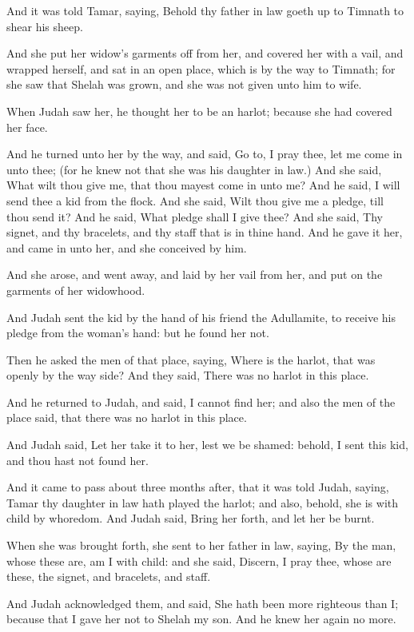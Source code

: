 \Verse And it was told Tamar, saying, Behold thy father in law goeth up to Timnath to shear his sheep.

\Verse And she put her widow's garments off from her, and covered her with a vail, and wrapped herself, and sat in an open place, which is by the way to Timnath; for she saw that Shelah was grown, and she was not given unto him to wife.

\Verse When Judah saw her, he thought her to be an harlot; because she had covered her face.

\Verse And he turned unto her by the way, and said, Go to, I pray thee, let me come in unto thee; (for he knew not that she was his daughter in law.) And she said, What wilt thou give me, that thou mayest come in unto me?  \Verse And he said, I will send thee a kid from the flock.  And she said, Wilt thou give me a pledge, till thou send it?  \Verse And he said, What pledge shall I give thee? And she said, Thy signet, and thy bracelets, and thy staff that is in thine hand. And he gave it her, and came in unto her, and she conceived by him.

\Verse And she arose, and went away, and laid by her vail from her, and put on the garments of her widowhood.

\Verse And Judah sent the kid by the hand of his friend the Adullamite, to receive his pledge from the woman's hand: but he found her not.

\Verse Then he asked the men of that place, saying, Where is the harlot, that was openly by the way side? And they said, There was no harlot in this place.

\Verse And he returned to Judah, and said, I cannot find her; and also the men of the place said, that there was no harlot in this place.

\Verse And Judah said, Let her take it to her, lest we be shamed: behold, I sent this kid, and thou hast not found her.

\Verse And it came to pass about three months after, that it was told Judah, saying, Tamar thy daughter in law hath played the harlot; and also, behold, she is with child by whoredom. And Judah said, Bring her forth, and let her be burnt.

\Verse When she was brought forth, she sent to her father in law, saying, By the man, whose these are, am I with child: and she said, Discern, I pray thee, whose are these, the signet, and bracelets, and staff.

\Verse And Judah acknowledged them, and said, She hath been more righteous than I; because that I gave her not to Shelah my son. And he knew her again no more.

